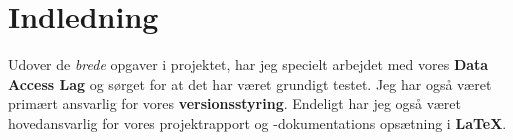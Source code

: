 \section{Indledning}

Udover de \textit{brede} opgaver i projektet, har jeg specielt arbejdet med vores \textbf{Data Access Lag} og sørget for at det har været grundigt testet. Jeg har også været primært ansvarlig for vores \textbf{versionsstyring}. Endeligt har jeg også været hovedansvarlig for vores projektrapport og -dokumentations opsætning i \textbf{\LaTeX}. 